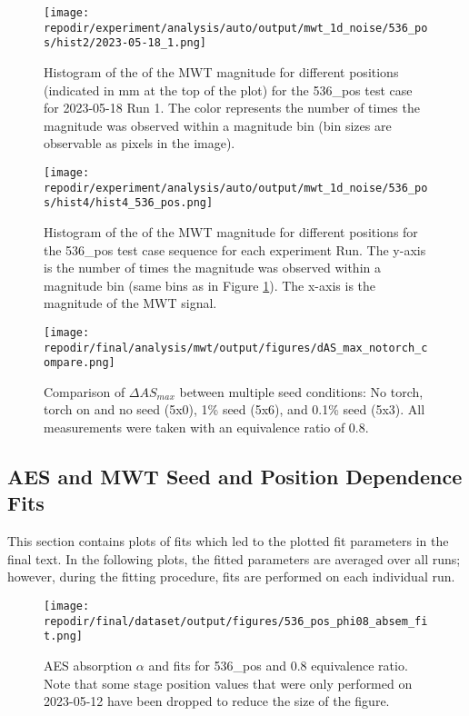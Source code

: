\begin{figure}
    \centering
    \texttt{[image: \\repodir/experiment/analysis/auto/output/mwt\_1d\_noise/536\_pos/hist2/2023-05-18\_1.png]} 
    \caption{Histogram of the of the MWT magnitude for different positions (indicated in mm at the top of the plot) for the 536\_pos test case for 2023-05-18 Run 1. The color represents the number of times the magnitude was observed within a magnitude bin (bin sizes are observable as pixels in the image). }
    \label{fig:SI_mwt_1d_noise_536_pos_hist2_2023-05-18_1}
\end{figure}

\begin{figure}
    \centering
    \texttt{[image: \\repodir/experiment/analysis/auto/output/mwt\_1d\_noise/536\_pos/hist4/hist4\_536\_pos.png]} 
    \caption{Histogram of the of the MWT magnitude for different positions for the 536\_pos test case sequence for each experiment Run. The y-axis is the number of times the magnitude was observed within a magnitude bin (same bins as in Figure \ref{fig:SI_mwt_1d_noise_536_pos_hist2_2023-05-18_1}). The x-axis is the magnitude of the MWT signal.}
    \label{fig:SI_mwt_1d_noise_536_pos_hist4_hist4_536_pos}
\end{figure}

\begin{figure}[]
\centering
\texttt{[image: \\repodir/final/analysis/mwt/output/figures/dAS\_max\_notorch\_compare.png]}
\caption{Comparison of $\Delta AS_{max}$ between multiple seed conditions: No torch, torch on and no seed (5x0), 1\% seed (5x6), and 0.1\% seed (5x3). All measurements were taken with an equivalence ratio of 0.8.}
\end{figure}


\clearpage
\subsection{AES and MWT Seed and Position Dependence Fits}

This section contains plots of fits which led to the plotted fit parameters in the final text. In the following plots, the fitted parameters are averaged over all runs; however, during the fitting procedure, fits are performed on each individual run. 

\begin{figure}[]
\centering
\texttt{[image: \\repodir/final/dataset/output/figures/536\_pos\_phi08\_absem\_fit.png]}
\caption{AES absorption $\alpha$ and fits for 536\_pos and 0.8 equivalence ratio. Note that some stage position values that were only performed on 2023-05-12 have been dropped to reduce the size of the figure. }
\label{fig:SI_536_pos_phi08_absem_fit}
\end{figure}

